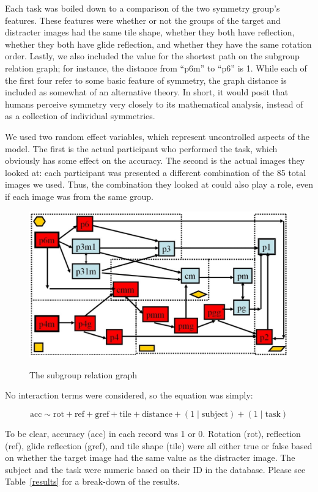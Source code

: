 Each task was boiled down to a comparison of the two symmetry group’s features. These features were whether or not the groups of the target and distracter images had the same tile shape, whether they both have reflection, whether they both have glide reflection, and whether they have the same rotation order. Lastly, we also included the value for the shortest path on the subgroup relation graph; for instance, the distance from “p6m” to “p6” is 1. While each of the first four refer to some basic feature of symmetry, the graph distance is included as somewhat of an alternative theory. In short, it would posit that humans perceive symmetry very closely to its mathematical analysis, instead of as a collection of individual symmetries.

We used two random effect variables, which represent uncontrolled aspects of the model. The first is the actual participant who performed the task, which obviously has some effect on the accuracy. The second is the actual images they looked at: each participant was presented a different combination of the 85 total images we used. Thus, the combination they looked at could also play a role, even if each image was from the same group.

\begin{figure}[!ht]
\centering
\includegraphics[width=0.9\columnwidth]{Yanxi_Graph}
\label{graph}
\caption{The subgroup relation graph}
\end{figure}

No interaction terms were considered, so the equation was simply: 

\[\mathrm{acc} \sim \mathrm{rot}+\mathrm{ref}+\mathrm{gref}+\mathrm{tile}+\mathrm{distance}+(1\mid \mathrm{subject})+(1 \mid \mathrm{task})\]

To be clear, accuracy (acc) in each record was 1 or 0. Rotation (rot), reflection (ref), glide reflection (gref), and tile shape (tile) were all either true or false based on whether the target image had the same value as the distracter image. The subject and the task were numeric based on their ID in the database. Please see Table~\ref{results} for a break-down of the results.


